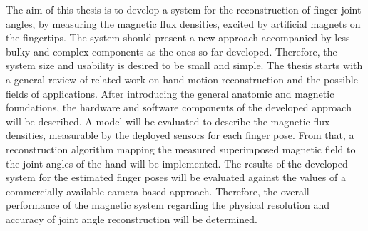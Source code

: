The aim of this thesis is to develop a system for the reconstruction of finger joint angles, by measuring the magnetic flux densities, excited by artificial magnets on the fingertips. The system should present a new approach accompanied by less bulky and complex components as the ones so far developed. Therefore, the system size and usability is desired to be small and simple. The thesis starts with a general review of related work on hand motion reconstruction and the possible fields of applications. After introducing the general anatomic and magnetic foundations, the hardware and software components of the developed approach will be described. A model will be evaluated to describe the magnetic flux densities, measurable by the deployed sensors for each finger pose. From that, a reconstruction algorithm mapping the measured superimposed magnetic field to the joint angles of the hand will be implemented. The results of the developed system for the estimated finger poses will be evaluated against the values of a commercially available camera based approach. Therefore, the overall performance of the magnetic system regarding the physical resolution and accuracy of joint angle reconstruction will be determined. 




